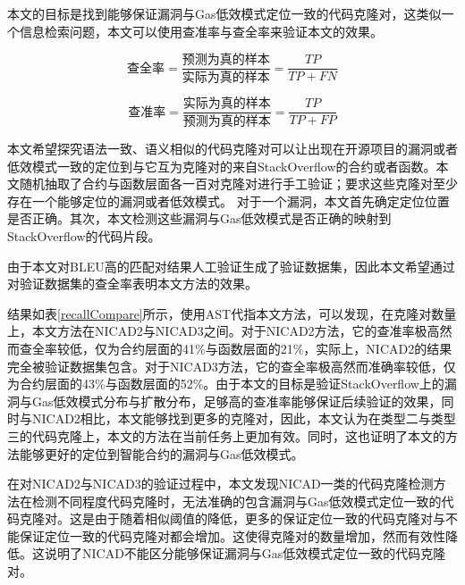 

本文的目标是找到能够保证漏洞与Gas低效模式定位一致的代码克隆对，这类似一个信息检索问题，本文可以使用查准率与查全率来验证本文的效果。

\begin{equation}
    \mbox{查全率}=\frac{\mbox{预测为真的样本}}{\mbox{实际为真的样本}}=\frac{TP}{TP+FN}   
\end{equation}

\begin{equation}
    \mbox{查准率}=\frac{\mbox{实际为真的样本}}{\mbox{预测为真的样本}}=\frac{TP}{TP+FP}
\end{equation}

本文希望探究语法一致、语义相似的代码克隆对可以让出现在开源项目的漏洞或者低效模式一致的定位到与它互为克隆对的来自StackOverflow的合约或者函数。本文随机抽取了合约与函数层面各一百对克隆对进行手工验证；要求这些克隆对至少存在一个能够定位的漏洞或者低效模式。
对于一个漏洞，本文首先确定定位位置是否正确。其次，本文检测这些漏洞与Gas低效模式是否正确的映射到StackOverflow的代码片段。

由于本文对BLEU高的匹配对结果人工验证生成了验证数据集，因此本文希望通过对验证数据集的查全率表明本文方法的效果。

结果如表\ref{recallCompare}所示，使用AST代指本文方法，可以发现，在克隆对数量上，本文方法在NICAD2与NICAD3之间。对于NICAD2方法，它的查准率极高然而查全率较低，仅为合约层面的41\%与函数层面的21\%，实际上，NICAD2的结果完全被验证数据集包含。对于NICAD3方法，它的查全率极高然而准确率较低，仅为合约层面的43\%与函数层面的52\%。由于本文的目标是验证StackOverflow上的漏洞与Gas低效模式分布与扩散分布，足够高的查准率能够保证后续验证的效果，同时与NICAD2相比，本文能够找到更多的克隆对，因此，本文认为在类型二与类型三的代码克隆上，本文的方法在当前任务上更加有效。同时，这也证明了本文的方法能够更好的定位到智能合约的漏洞与Gas低效模式。

在对NICAD2与NICAD3的验证过程中，本文发现NICAD一类的代码克隆检测方法在检测不同程度代码克隆时，无法准确的包含漏洞与Gas低效模式定位一致的代码克隆对。这是由于随着相似阈值的降低，更多的保证定位一致的代码克隆对与不能保证定位一致的代码克隆对都会增加。这使得克隆对的数量增加，然而有效性降低。这说明了NICAD不能区分能够保证漏洞与Gas低效模式定位一致的代码克隆对。

